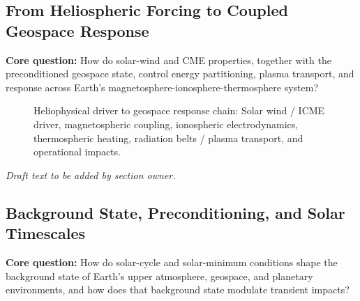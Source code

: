 \documentclass[
  draft
]{agujournal2025}
\begin{document}
\subsection{From Heliospheric Forcing to Coupled Geospace Response}
\noindent\textbf{Core question:} How do solar-wind and CME properties, together with the preconditioned geospace state, control energy partitioning, plasma transport, and response across Earth's magnetosphere-ionosphere-thermosphere system?


\begin{figure}[h]
\centering
{}
\caption{Heliophysical driver to geospace response chain: Solar wind / ICME driver, magnetospheric coupling, ionospheric electrodynamics, thermospheric heating, radiation belts / plasma transport, and operational impacts.}
\label{fig:geospace-response-chain}
\end{figure}

\noindent\textit{Draft text to be added by section owner.}

\subsection{Background State, Preconditioning, and Solar Timescales}
\noindent\textbf{Core question:} How do solar-cycle and solar-minimum conditions shape the background state of Earth's upper atmosphere, geospace, and planetary environments, and how does that background state modulate transient impacts?
\end{document}
